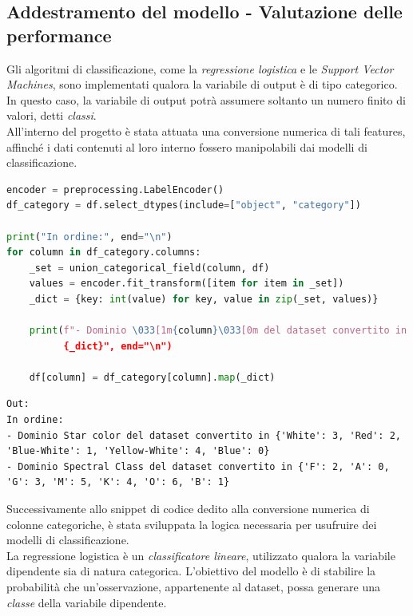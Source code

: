 \documentclass{article}
\begin{document}
    \subsection*{Addestramento del modello - Valutazione delle performance}
    Gli algoritmi di classificazione, come la \textit{regressione logistica} e le \textit{Support Vector Machines}, sono implementati qualora la variabile di output è di tipo categorico. In questo caso, la variabile di output potrà assumere soltanto un numero finito di valori, detti \textit{classi}. \vspace*{7pt}\\
    All'interno del progetto è stata attuata una conversione numerica di tali features, affinché i dati contenuti al loro interno fossero manipolabili dai modelli di classificazione.
    \begin{lstlisting}[language=Python]
encoder = preprocessing.LabelEncoder()
df_category = df.select_dtypes(include=["object", "category"])

print("In ordine:", end="\n")
for column in df_category.columns:
    _set = union_categorical_field(column, df)
    values = encoder.fit_transform([item for item in _set])
    _dict = {key: int(value) for key, value in zip(_set, values)}

    print(f"- Dominio \033[1m{column}\033[0m del dataset convertito in 
          {_dict}", end="\n")

    df[column] = df_category[column].map(_dict)
    \end{lstlisting}
    \begin{lstlisting}[style=Jupyter]
Out:
In ordine:
- Dominio Star color del dataset convertito in {'White': 3, 'Red': 2, 'Blue-White': 1, 'Yellow-White': 4, 'Blue': 0}
- Dominio Spectral Class del dataset convertito in {'F': 2, 'A': 0, 'G': 3, 'M': 5, 'K': 4, 'O': 6, 'B': 1}
    \end{lstlisting}
    Successivamente allo snippet di codice dedito alla conversione numerica di colonne categoriche, è stata sviluppata la logica necessaria per usufruire dei modelli di classificazione. \vspace*{7pt}\\
    La regressione logistica è un \textit{classificatore lineare}, utilizzato qualora la variabile dipendente sia di natura categorica. L'obiettivo del modello è di stabilire la probabilità che un'osservazione, appartenente al dataset, possa generare una \textit{classe} della variabile dipendente.
\end{document}
